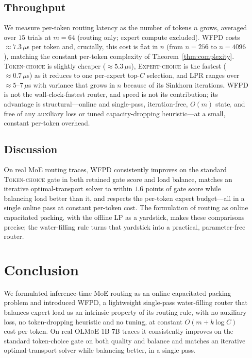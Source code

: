 \documentclass[preprint,12pt]{elsarticle}
\theoremstyle{plain}
\theoremstyle{remark}
\begin{document}
\subsection{Throughput}
\label{sec:exp-throughput}

We measure per-token routing latency as the number of tokens $n$ grows,
averaged over $15$ trials at $m=64$ (routing only; expert compute
excluded). WFPD costs $\approx 7.3\,\mu$s per token and, crucially, this
cost is flat in $n$ (from $n=256$ to $n=4096$), matching the constant
per-token complexity of Theorem~\ref{thm:complexity}. \textsc{Token-choice}
is slightly cheaper ($\approx 5.3\,\mu$s), \textsc{Expert-choice} is the
fastest ($\approx 0.7\,\mu$s) as it reduces to one per-expert top-$C$
selection, and \textsc{LPR} ranges over $\approx 5$--$7\,\mu$s with variance
that grows in $n$ because of its Sinkhorn iterations. WFPD is not the
wall-clock-fastest router, and speed is not its contribution; its advantage
is structural---online and single-pass, iteration-free, $O(m)$ state, and
free of any auxiliary loss or tuned capacity-dropping heuristic---at a
small, constant per-token overhead.

\subsection{Discussion}
\label{sec:exp-discussion}

On real MoE routing traces, WFPD consistently improves on the standard
\textsc{Token-choice} gate in both retained gate score and load balance,
matches an iterative optimal-transport solver to within $1.6$ points of gate
score while balancing load better than it, and respects the per-token expert
budget---all in a single online pass at constant per-token cost. The
formulation of routing as online capacitated packing, with the offline LP as
a yardstick, makes these comparisons precise; the water-filling rule turns
that yardstick into a practical, parameter-free router.

\section{Conclusion}
\label{sec:conclusion}

We formulated inference-time MoE routing as an online capacitated packing
problem and introduced WFPD, a lightweight single-pass water-filling router
that balances expert load as an intrinsic property of its routing rule, with
no auxiliary loss, no token-dropping heuristic and no tuning, at constant
$O(m+k\log C)$ cost per token. On real \textsc{OLMoE-1B-7B} traces it
consistently improves on the standard token-choice gate on both quality and
balance and matches an iterative optimal-transport solver while balancing
better, in a single pass.
\end{document}
